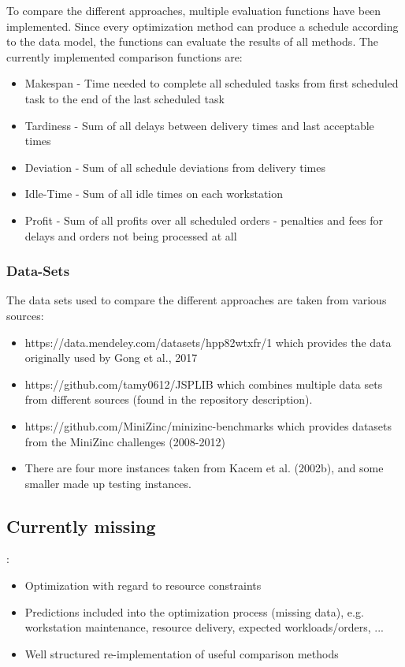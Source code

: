 \documentclass[a4paper,12pt,twoside]{scrreprt}
\begin{document}
\begin{flushleft}
To compare the different approaches, multiple evaluation functions have been implemented. Since every optimization method can produce a schedule according to the data model, the functions can evaluate the results of all methods.
The currently implemented comparison functions are:

\begin{itemize}
	\item Makespan - Time needed to complete all scheduled tasks from first scheduled task to the end of the last scheduled task
	\item Tardiness - Sum of all delays between delivery times and last acceptable times
	\item Deviation - Sum of all schedule deviations from delivery times
	\item Idle-Time - Sum of all idle times on each workstation
	\item Profit - Sum of all profits over all scheduled orders - penalties and fees for delays and orders not being processed at all
\end{itemize}

\subsubsection{Data-Sets}
	The data sets used to compare the different approaches are taken from various sources:
	\begin{itemize}	
		\item https://data.mendeley.com/datasets/hpp82wtxfr/1 which provides the data originally used by Gong et al., 2017
		\item https://github.com/tamy0612/JSPLIB which combines multiple data sets from different sources (found in the repository description).
		\item https://github.com/MiniZinc/minizinc-benchmarks which provides datasets from the MiniZinc challenges (2008-2012)
		\item There are four more instances taken from Kacem et al. (2002b), and some smaller made up testing instances.
	\end{itemize}
\subsection{Currently missing}:

\begin{itemize}
	\item Optimization with regard to resource constraints
	\item Predictions included into the optimization process (missing data), e.g. workstation maintenance, resource delivery, expected workloads/orders, ...
	\item Well structured re-implementation of useful comparison methods
\end{itemize}

\end{flushleft}
\end{document}
